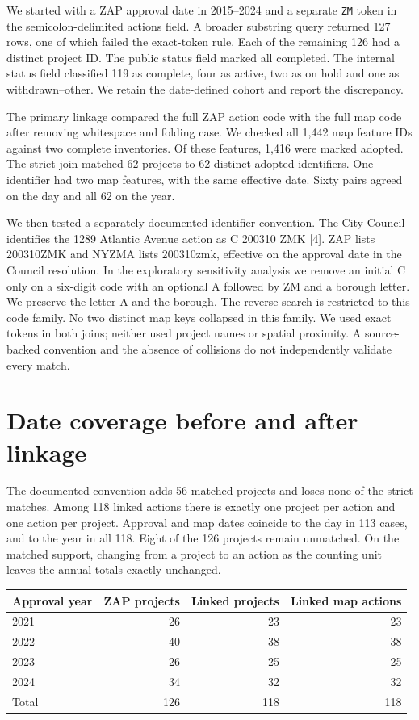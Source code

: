 \documentclass[11pt]{article}
\begin{document}
We started with a ZAP approval date in 2015--2024 and a separate \texttt{ZM} token in the semicolon-delimited actions field. A broader substring query returned 127 rows, one of which failed the exact-token rule. Each of the remaining 126 had a distinct project ID. The public status field marked all completed. The internal status field classified 119 as complete, four as active, two as on hold and one as withdrawn--other. We retain the date-defined cohort and report the discrepancy.

The primary linkage compared the full ZAP action code with the full map code after removing whitespace and folding case. We checked all 1,442 map feature IDs against two complete inventories. Of these features, 1,416 were marked adopted. The strict join matched 62 projects to 62 distinct adopted identifiers. One identifier had two map features, with the same effective date. Sixty pairs agreed on the day and all 62 on the year.

We then tested a separately documented identifier convention. The City Council identifies the 1289 Atlantic Avenue action as C 200310 ZMK [4]. ZAP lists 200310ZMK and NYZMA lists 200310zmk, effective on the approval date in the Council resolution. In the exploratory sensitivity analysis we remove an initial C only on a six-digit code with an optional A followed by ZM and a borough letter. We preserve the letter A and the borough. The reverse search is restricted to this code family. No two distinct map keys collapsed in this family. We used exact tokens in both joins; neither used project names or spatial proximity. A source-backed convention and the absence of collisions do not independently validate every match.

\section{Date coverage before and after linkage}
The documented convention adds 56 matched projects and loses none of the strict matches. Among 118 linked actions there is exactly one project per action and one action per project. Approval and map dates coincide to the day in 113 cases, and to the year in all 118. Eight of the 126 projects remain unmatched. On the matched support, changing from a project to an action as the counting unit leaves the annual totals exactly unchanged.

\begin{center}
\begin{tabular}{lrrr}
\toprule
Approval year & ZAP projects & Linked projects & Linked map actions\\
\midrule
2021 & 26 & 23 & 23\\
2022 & 40 & 38 & 38\\
2023 & 26 & 25 & 25\\
2024 & 34 & 32 & 32\\
\midrule
Total &126&118&118\\
\bottomrule
\end{tabular}
\end{center}
\end{document}

